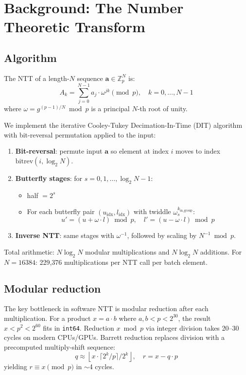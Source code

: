 \documentclass[11pt,a4paper]{article}
\begin{document}
\section{Background: The Number Theoretic Transform}

\subsection{Algorithm}

The NTT of a length-$N$ sequence $\mathbf{a} \in \mathbb{Z}_p^N$ is:
\[
  A_k = \sum_{j=0}^{N-1} a_j \cdot \omega^{jk} \pmod{p}, \quad k = 0, \ldots, N-1
\]
where $\omega = g^{(p-1)/N} \bmod p$ is a principal $N$-th root of unity.

We implement the iterative Cooley-Tukey Decimation-In-Time (DIT) algorithm with
bit-reversal permutation applied to the input:

\begin{enumerate}
  \item \textbf{Bit-reversal}: permute input $\mathbf{a}$ so element at index $i$ moves
    to index $\mathrm{bitrev}(i, \log_2 N)$.
  \item \textbf{Butterfly stages}: for $s = 0, 1, \ldots, \log_2 N - 1$:
    \begin{itemize}
      \item half $= 2^s$
      \item For each butterfly pair $(u_{\text{idx}}, l_{\text{idx}})$ with twiddle
        $\omega_s^{k_{\text{in\_group}}}$:
        \[
          u' = (u + \omega \cdot l) \bmod p, \quad l' = (u - \omega \cdot l) \bmod p
        \]
    \end{itemize}
  \item \textbf{Inverse NTT}: same stages with $\omega^{-1}$, followed by scaling by
    $N^{-1} \bmod p$.
\end{enumerate}

Total arithmetic: $N \log_2 N$ modular multiplications and $N \log_2 N$ additions.
For $N = 16384$: 229,376 multiplications per NTT call per batch element.

\subsection{Modular reduction}

The key bottleneck in software NTT is modular reduction after each multiplication.
For a product $x = a \cdot b$ where $a, b < p < 2^{30}$, the result $x < p^2 < 2^{60}$
fits in \texttt{int64}. Reduction $x \bmod p$ via integer division takes 20--30 cycles
on modern CPUs/GPUs. Barrett reduction replaces division with a precomputed
multiply-shift sequence:
\[
  q \approx \left\lfloor x \cdot \lceil 2^k / p \rceil / 2^k \right\rfloor, \quad
  r = x - q \cdot p
\]
yielding $r \equiv x \pmod{p}$ in $\sim$4 cycles.
\end{document}
